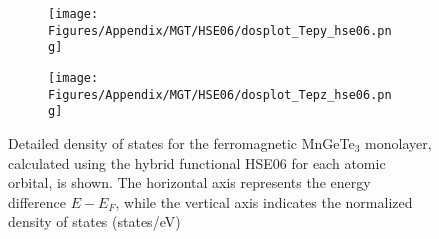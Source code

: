 \begin{figure}[H]
\begin{subfigure}{0.24\textwidth}
    \label{dosplot_MnTepx_hse06}
\end{subfigure}
\hfill
\begin{subfigure}{0.24\textwidth}
    \texttt{[image: Figures/Appendix/MGT/HSE06/dosplot\_Tepy\_hse06.png]}
    \label{dosplot_MnTepy_hse06}
\end{subfigure}
\begin{subfigure}{0.24\textwidth}
    \texttt{[image: Figures/Appendix/MGT/HSE06/dosplot\_Tepz\_hse06.png]}
    \label{dosplot_MnTepz_hse06}
\end{subfigure}
\hfill
     \caption{Detailed density of states for the ferromagnetic MnGeTe$_3$ monolayer, calculated using the hybrid functional HSE06 for each atomic orbital, is shown. The horizontal axis represents the energy difference $E - E_F$, while the vertical axis indicates the normalized density of states (states/eV)}
     \label{Mnhse06}
 \end{figure}


